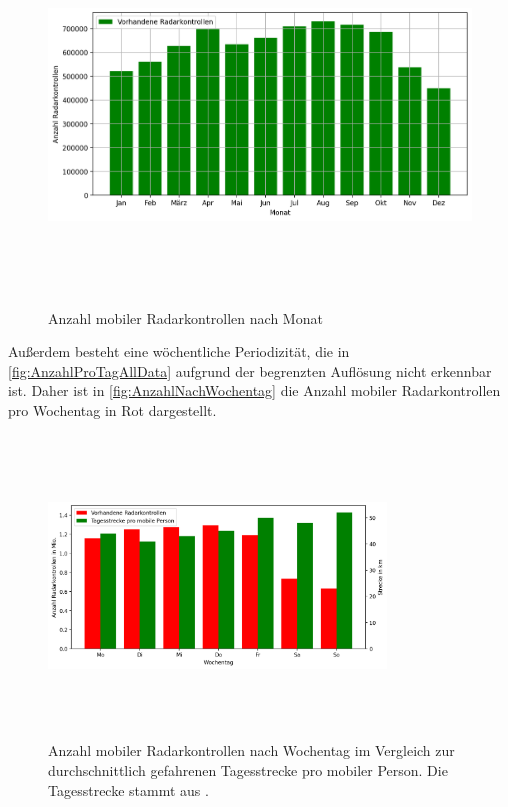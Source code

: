 \begin{figure}[h]
    \centering
    \includegraphics[width=1.0\textwidth,height=10cm,keepaspectratio=true]{content/images/AnzahlNachMonat.png}
    \caption{Anzahl mobiler Radarkontrollen nach Monat}
    \label{fig:AnzahlNachMonat}
\end{figure}

Außerdem besteht eine wöchentliche Periodizität, die in \autoref{fig:AnzahlProTagAllData} aufgrund der begrenzten Auflösung nicht erkennbar ist.
Daher ist in \autoref{fig:AnzahlNachWochentag} die Anzahl mobiler Radarkontrollen pro Wochentag in Rot dargestellt.

\begin{figure}[h]
    \centering
    \includegraphics[width=0.8\textwidth,height=8cm,keepaspectratio=true]{content/images/AnzahlNachWochentag.png}
    \caption{Anzahl mobiler Radarkontrollen nach Wochentag im Vergleich zur durchschnittlich gefahrenen Tagesstrecke pro mobiler Person. Die Tagesstrecke stammt aus \cite[Tabelle 3]{MiD}.}
    \label{fig:AnzahlNachWochentag}
\end{figure}

